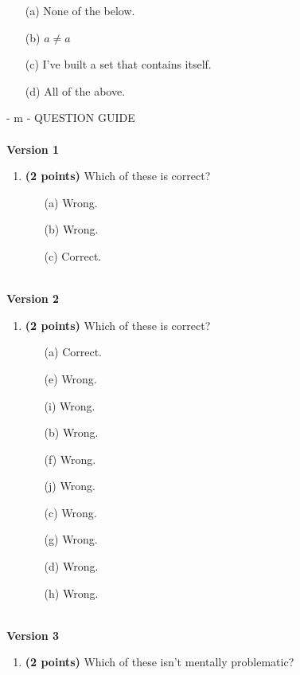 \documentclass[12pt]{amsart}
\begin{document}
\begin{enumerate}[resume]
\begin{minipage}[t]{1.0\linewidth}\begin{itemize}\item[(a)]  None of the below.  \item[(b)]  $a \neq a$ \item[(c)]  I've built a set that contains itself. \item[(d)]   All of the above. \end{itemize}\end{minipage} \vfill \end{enumerate} - m - QUESTION GUIDE \\$ $ \\ {\bf Version 1} \\\begin{enumerate}[resume]
\item {\bf (2 points)} 
 Which of these is correct?

\begin{minipage}[t]{1.0\linewidth}\begin{multicols}{3}\begin{itemize}\item[(a)]  Wrong. \item[(b)]  Wrong. \item[(c)]  Correct. \end{itemize}\end{multicols}\end{minipage} \vfill \end{enumerate}$ $ \\ {\bf Version 2} \\\begin{enumerate}[resume]
\item {\bf (2 points)} 
 Which of these is correct?

\begin{minipage}[t]{1.0\linewidth}\begin{multicols}{4}\begin{itemize}\item[(a)]  Correct. \item[(e)]  Wrong. \item[(i)]  Wrong. \item[(b)]  Wrong. \item[(f)]  Wrong. \item[(j)]  Wrong. \item[(c)]  Wrong. \item[(g)]  Wrong. \item[] \item[(d)]  Wrong. \item[(h)]  Wrong. \item[] \end{itemize}\end{multicols}\end{minipage} \vfill \end{enumerate}$ $ \\ {\bf Version 3} \\\begin{enumerate}[resume]
\item {\bf (2 points)} 
 Which of these isn't mentally problematic?


\end{enumerate}
\end{document}
